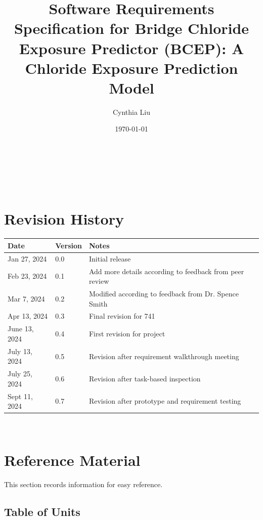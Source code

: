 \documentclass[12pt]{article}
\begin{document}
\title{Software Requirements Specification for Bridge Chloride Exposure Predictor (BCEP): A Chloride Exposure Prediction Model} 
\author{Cynthia Liu}
\date{\today}
	
\maketitle

~\newpage


\tableofcontents

~\newpage

\section*{Revision History}

\begin{tabularx}{\textwidth}{p{3cm}p{2cm}X}
\toprule {\bf Date} & {\bf Version} & {\bf Notes}\\
\midrule
Jan 27, 2024 & 0.0 & Initial release\\
Feb 23, 2024 & 0.1 & Add more details according to feedback from peer review\\
Mar 7, 2024 & 0.2 & Modified according to feedback from Dr. Spence Smith\\
Apr 13, 2024 & 0.3 & Final revision for 741\\
June 13, 2024 & 0.4 & First revision for project\\
July 13, 2024 & 0.5 & Revision after requirement walkthrough meeting\\
July 25, 2024 & 0.6 & Revision after task-based inspection\\
Sept 11, 2024 & 0.7 & Revision after prototype and requirement testing\\
\bottomrule
\end{tabularx}

~\newpage

\section{Reference Material}

This section records information for easy reference.

\subsection{Table of Units}
\end{document}
